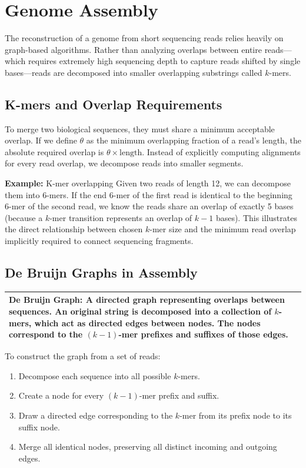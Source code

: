 \documentclass[11pt,a4paper]{article}
\newenvironment{important}
    {\vspace{1em}\noindent\begin{tabular}{|p{0.97\textwidth}|}\hline\vspace{0.1em}}
    {\vspace{0.1em}\\\hline\end{tabular}\vspace{1em}}
\begin{document}
\section{Genome Assembly}

The reconstruction of a genome from short sequencing reads relies heavily on graph-based algorithms. Rather than analyzing overlaps between entire reads—which requires extremely high sequencing depth to capture reads shifted by single bases—reads are decomposed into smaller overlapping substrings called $k$-mers.

\subsection{K-mers and Overlap Requirements}
To merge two biological sequences, they must share a minimum acceptable overlap. If we define $\theta$ as the minimum overlapping fraction of a read's length, the absolute required overlap is $\theta \times \text{length}$. Instead of explicitly computing alignments for every read overlap, we decompose reads into smaller segments. 

\textbf{Example:} K-mer overlapping
Given two reads of length 12, we can decompose them into 6-mers. If the end 6-mer of the first read is identical to the beginning 6-mer of the second read, we know the reads share an overlap of exactly 5 bases (because a $k$-mer transition represents an overlap of $k-1$ bases).
This illustrates the direct relationship between chosen $k$-mer size and the minimum read overlap implicitly required to connect sequencing fragments.

\subsection{De Bruijn Graphs in Assembly}

\begin{important}
\textbf{De Bruijn Graph}: A directed graph representing overlaps between sequences. An original string is decomposed into a collection of $k$-mers, which act as directed edges between nodes. The nodes correspond to the $(k-1)$-mer prefixes and suffixes of those edges.
\end{important}

To construct the graph from a set of reads:
\begin{enumerate}
    \item Decompose each sequence into all possible $k$-mers.
    \item Create a node for every $(k-1)$-mer prefix and suffix.
    \item Draw a directed edge corresponding to the $k$-mer from its prefix node to its suffix node.
    \item Merge all identical nodes, preserving all distinct incoming and outgoing edges.
\end{enumerate}
\end{document}
